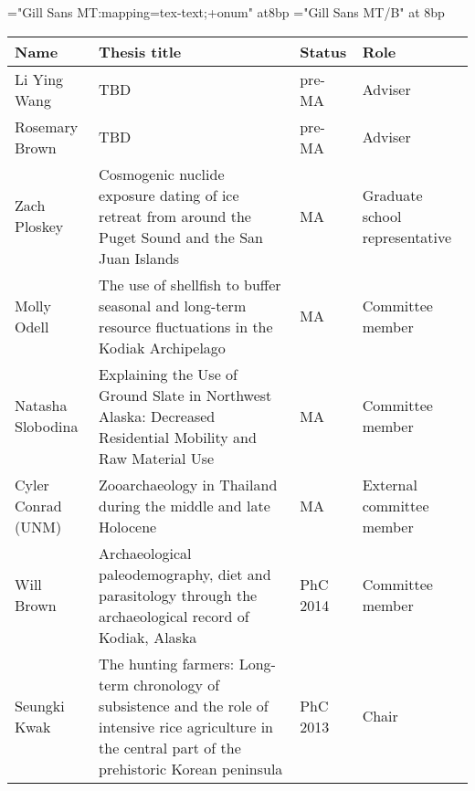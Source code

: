 \documentclass[11pt,article,oneside,oldfontcommands]{memoir}
\begin{document}
\begin{Spacing}{0.7}

\def\mainfont{Gill Sans MT}
\font\bodyfont="\mainfont:mapping=tex-text;+onum" at8bp \let\tenrm\bodyfont
\font\boldfont="\mainfont/B" at 8bp \let\tenbf\boldfont
\bodyfont

\begin{center}
\def\arraystretch{1}%
    \begin{longtable}{ l L{6cm} p{2cm}  p{2cm} }
     Name   & Thesis title  & Status     & Role    \\ 
   \midrule
     \endhead 
    
     Li Ying Wang           & TBD                                                                                                                                                          & pre-MA             & Adviser                        \\
    Rosemary Brown          & TBD                                                                                                                                                          & pre-MA             & Adviser                        \\
    Zach Ploskey            & Cosmogenic nuclide exposure dating of ice retreat from around the Puget Sound and the San Juan Islands                                                       & MA                 & Graduate school representative \\
    Molly Odell             & The use of shellfish to buffer seasonal and long-term resource fluctuations in the Kodiak Archipelago                                                        & MA                 & Committee member               \\
    Natasha Slobodina       & Explaining the Use of Ground Slate in Northwest Alaska: Decreased Residential Mobility and Raw Material Use                                                  & MA                 & Committee member               \\
    Cyler Conrad (UNM)      & Zooarchaeology in Thailand during the middle and late Holocene   & MA                 & External committee member      \\
    Will Brown              & Archaeological paleodemography, diet and parasitology through the  archaeological record of Kodiak, Alaska                                                   & PhC 2014           & Committee member               \\
    Seungki Kwak            & The hunting farmers: Long-term chronology of subsistence and the role of intensive rice agriculture in the central part of the  prehistoric Korean peninsula & PhC 2013           & Chair                          \\

\end{longtable}
\end{center}
\end{Spacing}
\end{document}
